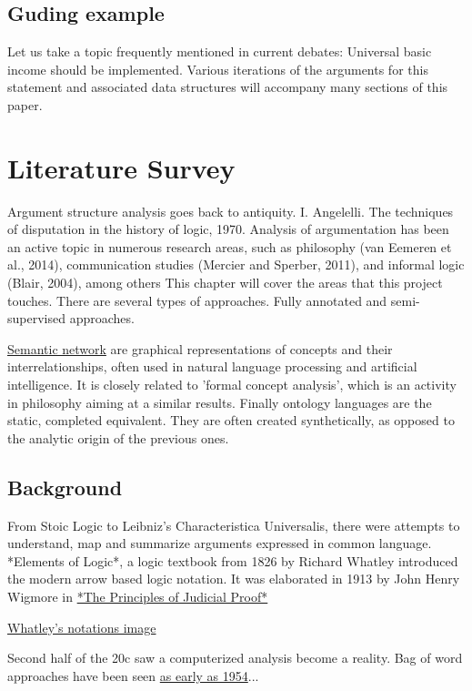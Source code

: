 \documentclass{article}
\begin{document}
\section{Guding example}

Let us take a topic frequently mentioned in current debates: Universal basic income should be implemented.
Various iterations of the arguments for this statement and associated data structures will accompany many sections of this paper.

\newpage

\chapter{Literature Survey}
Argument structure analysis goes back to antiquity. I. Angelelli. The techniques of disputation in the history of logic, 1970.
Analysis of argumentation has been an active topic in numerous research areas, such as philosophy (van Eemeren et al., 2014), communication studies (Mercier and Sperber, 2011), and informal logic (Blair, 2004), among others This chapter will cover the areas that this project touches. There are several types of approaches. Fully annotated and semi-supervised approaches.

\href{https://en.wikipedia.org/wiki/Semantic_network}{Semantic network} are graphical representations of concepts and their interrelationships, often used in natural language processing and artificial intelligence. It is closely related to 'formal concept analysis', which is an activity in philosophy aiming at a similar results. Finally ontology languages are the static, completed equivalent. They are often created synthetically, as opposed to the analytic origin of the previous ones.

\section{Background}
From Stoic Logic to Leibniz's Characteristica Universalis, there were attempts to understand, map and summarize arguments expressed in common language. 
*Elements of Logic*, a logic textbook from 1826 by Richard Whatley introduced the modern arrow based logic notation. It was elaborated in 1913 by John Henry Wigmore in \href{https://archive.org/details/principlesjudic00wigmgoog}{*The Principles of Judicial Proof*}

\href{https://commons.wikimedia.org/wiki/File:Whatley.png}{Whatley's notations image}

Second half of the 20c saw a computerized analysis become a reality. Bag of word approaches have been seen \href{https://www.tandfonline.com/doi/abs/10.1080/00437956.1954.11659520}{as early as 1954}...
\end{document}
